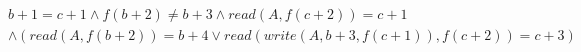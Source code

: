 \begin{align*}
%
& %
b + 1 = c + 1
%
\land
%
f(b + 2)  \neq  b + 3
%
\land
%
\mathit{read}(A,f(c + 2)) = c + 1
~\\~
& %
%
\land
%
(\mathit{read}(A,f(b + 2)) = b + 4 \lor \mathit{read}(\mathit{write}(A,b + 3,f(c + 1)),f(c + 2)) = c + 3)
%
\end{align*}
